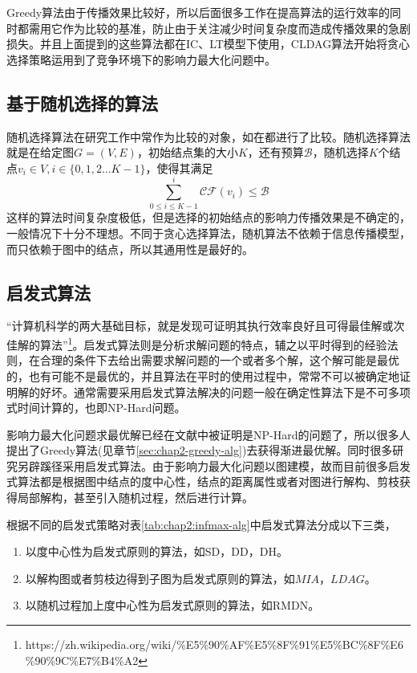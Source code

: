 Greedy算法由于传播效果比较好，所以后面很多工作在提高算法的运行效率的同时都需用它作为比较的基准，防止由于关注减少时间复杂度而造成传播效果的急剧损失。并且上面提到的这些算法都在IC、LT模型下使用，CLDAG算法开始将贪心选择策略运用到了竞争环境下的影响力最大化问题中。


\subsection{基于随机选择的算法}
\label{sec:chap2-random-alg}
随机选择算法在研究工作中常作为比较的对象，如在\cite{kempe2003maximizing}\cite{chen2009efficient}\cite{hu2015rmdn}都进行了比较。随机选择算法就是在给定图$G=(V, E)$，初始结点集的大小$K$，还有预算$\mathcal{B}$，随机选择$K$个结点$v_{i} \in V, i \in \{0, 1, 2 \dots K-1\}$，使得其满足
\begin{displaymath}
\sum_{0 \leq i \leq K-1}^{i} \mathcal{CF}(v_{i}) \leq \mathcal{B}
\end{displaymath}
这样的算法时间复杂度极低，但是选择的初始结点的影响力传播效果是不确定的，一般情况下十分不理想。不同于贪心选择算法，随机算法不依赖于信息传播模型，而只依赖于图中的结点，所以其通用性是最好的。


\subsection{启发式算法}
\label{sec:chap2-heuristic-alg}
“计算机科学的两大基础目标，就是发现可证明其执行效率良好且可得最佳解或次佳解的算法”\footnote{https://zh.wikipedia.org/wiki/\%E5\%90\%AF\%E5\%8F\%91\%E5\%BC\%8F\%E6\%90\%9C\%E7\%B4\%A2}。启发式算法则是分析求解问题的特点，辅之以平时得到的经验法则，在合理的条件下去给出需要求解问题的一个或者多个解，这个解可能是最优的，也有可能不是最优的，并且算法在平时的使用过程中，常常不可以被确定地证明解的好坏。通常需要采用启发式算法解决的问题一般在确定性算法下是不可多项式时间计算的，也即NP-Hard问题。


影响力最大化问题求最优解已经在文献\cite{kempe2003maximizing}中被证明是NP-Hard的问题了，所以很多人提出了Greedy算法(见章节\ref{sec:chap2-greedy-alg})去获得渐进最优解。同时很多研究\cite{chen2010scalableKDD}\cite{chen2010scalableICDM}\cite{chen2009efficient}\cite{hu2015rmdn}另辟蹊径采用启发式算法。由于影响力最大化问题以图建模，故而目前很多启发式算法都是根据图中结点的度中心性\cite{bonacich1972factoring}，结点的距离属性\cite{kimura2006tractable}或者对图进行解构、剪枝获得局部解构，甚至引入随机过程\cite{hu2015rmdn}，然后进行计算。


根据不同的启发式策略对表\ref{tab:chap2:infmax-alg}中启发式算法分成以下三类，
\begin{enumerate}
\item 以度中心性为启发式原则的算法，如SD\cite{chen2009efficient}，DD\cite{chen2009efficient}，DH\cite{hu2015rmdn}。
\item 以解构图或者剪枝边得到子图为启发式原则的算法，如$MIA$\cite{chen2010scalableKDD}，$LDAG$\cite{chen2010scalableICDM}。
\item 以随机过程加上度中心性为启发式原则的算法，如RMDN\cite{hu2015rmdn}。
\end{enumerate}





